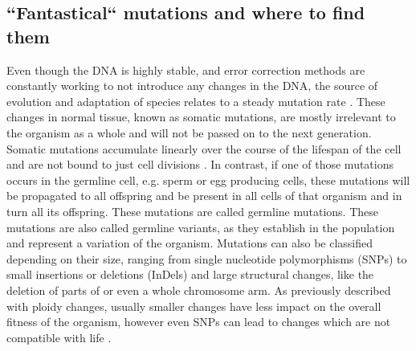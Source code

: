 \subsection[Mutations]{``Fantastical`` mutations and where to find them}
\label{intro-sec:mutations}
Even though the DNA is highly stable, and error correction methods are constantly working to not introduce any changes in the DNA, the source of evolution and adaptation of species relates to a steady mutation rate \cite{Darwin2010,Sprouffske2018}. These changes in normal tissue, known as somatic mutations, are mostly irrelevant to the organism as a whole and will not be passed on to the next generation. Somatic mutations accumulate linearly over the course of the lifespan of the cell and are not bound to just cell divisions \cite{Alexandrov2015,Moore2021,Cagan2022}. 
In contrast, if one of those mutations occurs in the germline cell, e.g. sperm or egg producing cells, these mutations will be propagated to all offspring and be present in all cells of that organism and in turn all its offspring. These mutations are called germline mutations. These mutations are also called germline variants, as they establish in the population and represent a variation of the organism.
Mutations can also be classified depending on their size, ranging from single nucleotide polymorphisms (SNPs) to small insertions or deletions (InDels) and large structural changes, like the deletion of parts of or even a whole chromosome arm. As previously described with ploidy changes, usually smaller changes have less impact on the overall fitness of the organism, however even SNPs can lead to changes which are not compatible with life \cite{Shamseldin2015,Frey2021}.

